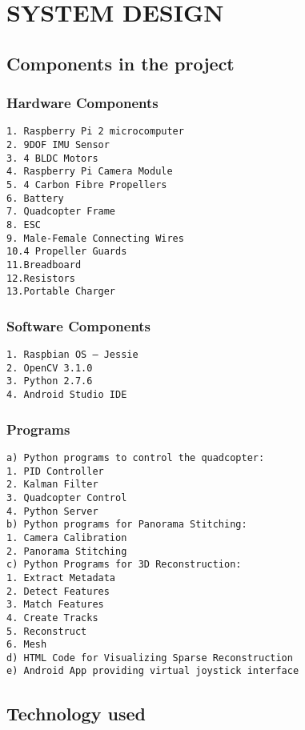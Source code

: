 \chapter{SYSTEM DESIGN} %


\section{Components in the project}
\subsection{Hardware Components}
\begin{verbatim}
1. Raspberry Pi 2 microcomputer
2. 9DOF IMU Sensor
3. 4 BLDC Motors
4. Raspberry Pi Camera Module
5. 4 Carbon Fibre Propellers
6. Battery
7. Quadcopter Frame
8. ESC
9. Male-Female Connecting Wires
10.4 Propeller Guards
11.Breadboard
12.Resistors
13.Portable Charger
\end{verbatim}
\subsection{Software Components}
\begin{verbatim}
1. Raspbian OS – Jessie
2. OpenCV 3.1.0
3. Python 2.7.6
4. Android Studio IDE
\end{verbatim}
\subsection{Programs}
\begin{verbatim}
a) Python programs to control the quadcopter:
1. PID Controller
2. Kalman Filter
3. Quadcopter Control
4. Python Server
b) Python programs for Panorama Stitching:
1. Camera Calibration
2. Panorama Stitching
c) Python Programs for 3D Reconstruction:
1. Extract Metadata
2. Detect Features
3. Match Features
4. Create Tracks
5. Reconstruct
6. Mesh
d) HTML Code for Visualizing Sparse Reconstruction
e) Android App providing virtual joystick interface
\end{verbatim}

\section{Technology used}
